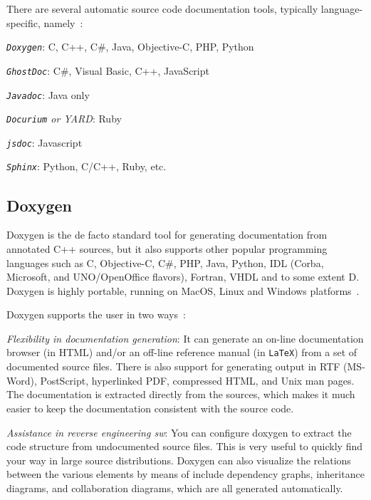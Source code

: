 There are several automatic source code documentation tools, typically
language-specific, namely~\cite{sourceCodeDocBestPractices}:
\begin{item-c}
\item \emph{\texttt{Doxygen}}: C, C++, C\#, Java, Objective-C, PHP, Python
\item \emph{\texttt{GhostDoc}}: C\#, Visual Basic, C++, JavaScript
\item \emph{\texttt{Javadoc}}: Java only
\item \emph{\texttt{Docurium} or \emph{YARD}}: Ruby
\item \emph{\texttt{jsdoc}}: Javascript
\item \emph{\texttt{Sphinx}}: Python, C/C++, Ruby, etc.
\end{item-c}

\subsection{Doxygen}
\label{sec:doxygen}
Doxygen is the de facto standard tool for generating documentation from
annotated C++ sources, but it also supports other popular programming languages
such as C, Objective-C, C\#, PHP, Java, Python, IDL (Corba, Microsoft, and
UNO/OpenOffice flavors), Fortran, VHDL and to some extent D.
Doxygen is highly portable, running on MacOS, Linux and Windows platforms~\cite{doxygenIndex}.

Doxygen supports the user in two ways~\cite{doxygenIndex}:
\begin{enum-c}
\item \emph{Flexibility in documentation generation}:
  It can generate an on-line documentation browser (in HTML) and/or an
  off-line reference manual (in \texttt{LaTeX}) from a set of documented source
  files. There is also support for generating output in RTF (MS-Word),
  PostScript, hyperlinked PDF, compressed HTML, and Unix man pages. The
  documentation is extracted directly from the sources, which makes it much
  easier to keep the documentation consistent with the source code.
\item \emph{Assistance in reverse engineering \gls{sw}}:
  You can configure doxygen to extract the code structure from undocumented
  source files. This is very useful to quickly find your way in large source
  distributions. Doxygen can also visualize the relations between the various
  elements by means of include dependency graphs, inheritance diagrams, and
  collaboration diagrams, which are all generated automatically.
\end{enum-c}


